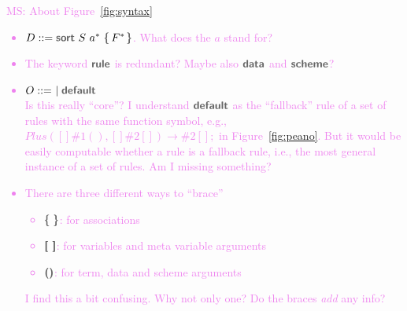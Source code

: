 \documentclass[letterpaper,11pt]{article}
\newcommand{\MS}[1]{\textcolor{violet}{MS: #1}}
\begin{document}
\MS{About Figure~\ref{fig:syntax}
  \begin{itemize}
  \item $ D ::= \kw{sort}~S~a^*~\kwm\{\, F^*\,\kwm\}$. What does the $a$ stand for?
  \item The keyword $\kw{rule}$ is redundant? Maybe also $\kw{data}$ and $\kw{scheme}$?
  \item $O ::= ~\mid \kw{default}$ \\
    Is this really ``core''? I understand $\kw{default}$ as the ``fallback'' rule of a set of rules
    with the same function symbol, e.g., $ Plus([]\#1(), []\#2[]) → \#2[] ;$ in
    Figure~\ref{fig:peano}. But it would be easily computable whether a rule is a fallback rule,
    i.e., the most general instance of a set of rules. Am I missing something?
  \item There are three different ways to ``brace'' 
     \begin{itemize}
     \item $\kwm\{\ \kwm\} $: for associations
     \item $\kw{[ ]}$: for variables and meta variable arguments
     \item $\kw{()}$: for term, data and scheme arguments
     \end{itemize}
     I find this a bit confusing. Why not only one? Do the braces \emph{add} any info?
  \end{itemize}
}
\end{document}
